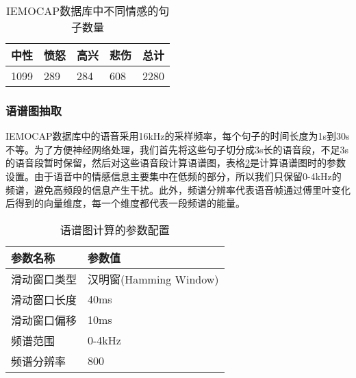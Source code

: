 \begin{table}[htb]
\centering
\begin{minipage}[t]{0.8\linewidth} %
\caption{IEMOCAP数据库中不同情感的句子数量}
\label{tab:end2end_emo_sample_num}
    \begin{tabularx}{\linewidth}{X<{\centering} X<{\centering} X<{\centering} X<{\centering} X<{\centering}}
        \toprule[1.5pt]
        中性 & 愤怒 & 高兴 & 悲伤 & 总计 \\
        \midrule[1pt]
        1099 & 289 & 284 & 608 & 2280 \\
        \bottomrule[1.5pt]
    \end{tabularx}
\end{minipage}
\end{table}

\subsubsection{语谱图抽取}
\label{ssec:end2end_spectrogram_extract}

IEMOCAP数据库中的语音采用16kHz的采样频率，每个句子的时间长度为1s到30s不等。为了方便神经网络处理，我们首先将这些句子切分成3s长的语音段，不足3s的语音段暂时保留，然后对这些语音段计算语谱图，表格\ref{tab:end2end_spectrogram_setup}是计算语谱图时的参数设置。由于语音中的情感信息主要集中在低频的部分，所以我们只保留0-4kHz的频谱，避免高频段的信息产生干扰。此外，频谱分辨率代表语音帧通过傅里叶变化后得到的向量维度，每一个维度都代表一段频谱的能量。

\begin{table}[htb]
\centering
\begin{minipage}[t]{0.8\linewidth} %
\caption{语谱图计算的参数配置}
\label{tab:end2end_spectrogram_setup}
    \begin{tabularx}{\linewidth}{X<{\centering} X<{\centering}}
        \toprule[1.5pt]
        参数名称 & 参数值 \\
        \midrule[1pt]
        滑动窗口类型 & 汉明窗(Hamming Window) \\
        滑动窗口长度 & 40ms \\
        滑动窗口偏移 & 10ms \\
        频谱范围 & 0-4kHz \\
        频谱分辨率 & 800 \\
        \bottomrule[1.5pt]
    \end{tabularx}
\end{minipage}
\end{table}

